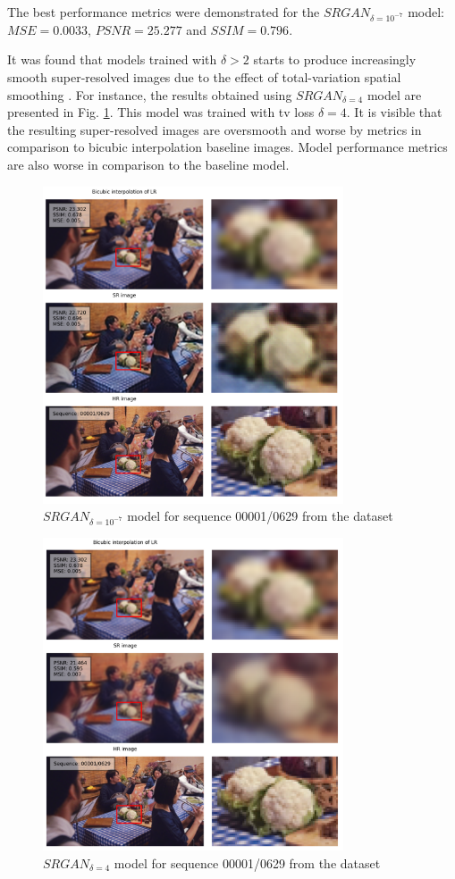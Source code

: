 \documentclass[conference]{IEEEtran}
\begin{document}
The best performance metrics were demonstrated for the $SRGAN_{\delta=10^{-7}}$ model: $MSE=0.0033$, $PSNR=25.277$ and $SSIM=0.796$.

It was found that models trained with $\delta > 2$ starts to produce increasingly smooth super-resolved images due to the effect of total-variation spatial smoothing \cite{image_upsampling_total_variation_regularization_2005}. For instance, the results obtained using $SRGAN_{\delta=4}$ model are presented in Fig. \ref{fig:tv_1e_7_seq_00001_0629}. This model was trained with \acrshort{tv} loss $\delta=4$. It is visible that the resulting super-resolved images are oversmooth and worse by metrics in comparison to bicubic interpolation baseline images. Model performance metrics are also worse in comparison to the baseline model.

\begin{figure}[htb]
	\centering
    \centerline{\includegraphics[width=8.9cm]{results/00001_0629}}
	\caption{$SRGAN_{\delta=10^{-7}}$ model for sequence 00001/0629 from the dataset \cite{vimeo90k_2019}}
	\label{fig:tv_1e_7_seq_00001_0629}
\end{figure}

\begin{figure}[htb]
	\centering
    \centerline{\includegraphics[width=8.9cm]{results/tv_4_00001_0629}}
	\caption{$SRGAN_{\delta=4}$ model for sequence 00001/0629 from the dataset \cite{vimeo90k_2019}}
	\label{fig:tv_4_seq_00001_0629}
\end{figure}
\end{document}
